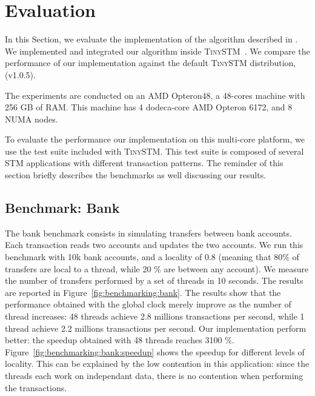 \section{Evaluation}

In this Section, we evaluate the implementation of the algorithm described in .  
We implemented and integrated our algorithm inside \textsc{TinySTM}~\cite{FelberFMR10}.
We compare the performance of our implementation against the default \textsc{TinySTM} distribution, (v1.0.5).

The experiments are conducted on an AMD Opteron48, a 48-cores machine with 256 GB of RAM. 
This machine has 4 dodeca-core AMD Opteron 6172, and 8 NUMA nodes.

To evaluate the performance our implementation on this multi-core platform, we use the test suite included with \textsc{TinySTM}. 
This test suite is composed of several STM applications with different transaction patterns.
The reminder of this section briefly describes the benchmarks as well discussing our results.
 
\subsection{Benchmark: Bank}

The bank benchmark consists in simulating transfers between bank accounts. 
Each transaction reads two accounts and updates the two accounts. 
We run this benchmark with 10k bank accounts, and a locality
of 0.8 (meaning that 80\% of transfers are local to a thread, while 20
\% are between any account). 
We measure the number of transfers performed by a set of threads in 10 seconds.
The results are reported in Figure~\ref{fig:benchmarking:bank}.%
%
The results show that the performance obtained with the global clock
merely improve as the number of thread increases: 48 threads achieve 2.8
millions transactions per second, while 1 thread achieve 2.2 millions
transactions per second.
%
Our implementation perform better: the speedup obtained with 48 threads reaches 3100 \%. 
Figure~\ref{fig:benchmarking:bank:speedup} shows the speedup for different levels of locality.
This  can be explained by the low contention in this application: since the threads each work on independant data, there is no contention when  performing the transactions.

